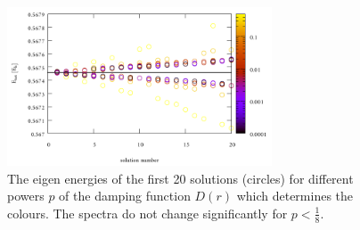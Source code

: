 \begin{figure}
\includegraphics[width=0.7\textwidth]{Figures/IFem_powers_spectra}
\caption{The eigen energies of the first 20 solutions (circles) for different powers $p$ of the damping function $D(r)$ which determines the colours.
The spectra do not change significantly for $p<\frac 18$.}
\label{fig:powerSpect}
\end{figure}
